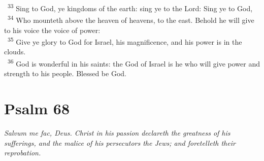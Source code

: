 \documentclass[a5paper,12pt]{article}
\begin{document}
\begin{multicols*}{2}
~\textsuperscript{33} Sing to God, ye kingdoms of the earth: sing ye to the Lord: Sing ye to God,\\
~\textsuperscript{34} Who mounteth above the heaven of heavens, to the east. Behold he will give to his voice the voice of power:\\
~\textsuperscript{35} Give ye glory to God for Israel, his magnificence, and his power is in the clouds.\\
~\textsuperscript{36} God is wonderful in his saints: the God of Israel is he who will give power and strength to his people. Blessed be God.\\

\section{Psalm 68}
\label{sec:org0c3e1c6}
\emph{Salvum me fac, Deus. Christ in his passion declareth the greatness of his sufferings, and the malice of his persecutors the Jews; and foretelleth their reprobation.}\\


\end{multicols*}
\end{document}
